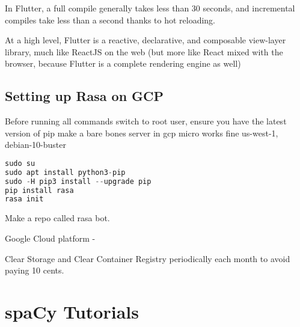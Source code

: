
In Flutter, a full compile
generally takes less than 30 seconds, and incremental compiles take less than a second
thanks to hot reloading. 

At a high level, Flutter is a reactive, declarative, and composable view-layer library,
much like ReactJS on the web (but more like React mixed with the browser, because
Flutter is a complete rendering engine as well)


\section{Setting up Rasa on GCP}

Before running all commands switch to root user, ensure you have the latest version of pip
make a bare bones server in gcp micro works fine us-west-1, debian-10-buster

\begin{lstlisting}[language=C++, caption={Bash Script}]
sudo su
sudo apt install python3-pip
sudo -H pip3 install --upgrade pip
pip install rasa
rasa init
\end{lstlisting}

Make a repo called rasa bot.

Google Cloud platform -

Clear Storage and Clear Container Registry periodically each month to avoid paying 10 cents.

\chapter{spaCy Tutorials}

\begingroup
\UseRawInputEncoding

\endgroup




